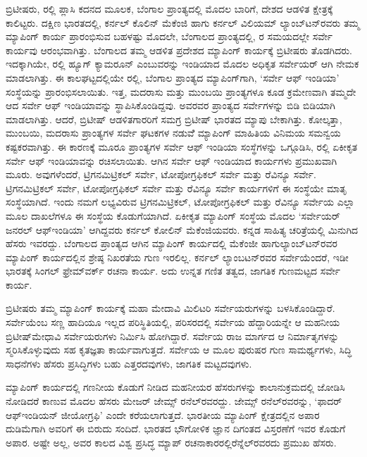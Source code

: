 ಬ್ರಿಟೀಷರು,  ರಲ್ಲಿ ಪ್ಲಾಸಿ ಕದನದ ಮೂಲಕ, ಬೆಂಗಾಲ ಪ್ರಾಂತ್ಯದಲ್ಲಿ ಮೊದಲ ಬಾರಿಗೆ, ದೇಶದ ಆಡಳಿತ ಕ್ಷೇತ್ರಕ್ಕೆ ಕಾಲಿಟ್ಟರು. ದಕ್ಷಿಣ ಭಾರತದಲ್ಲಿ, ಕರ್ನಲ್​ ಕೊಲಿನ್​ ಮೆಕೆಂಜಿ ಹಾಗು ಕರ್ನಲ್​ ವಿಲಿಯಮ್ ಲ್ಯಾಂಬ್​ಟನ್​ರವರು ತಮ್ಮ ಮ್ಯಾಪಿಂಗ್​ ಕಾರ್ಯ ಪ್ರಾರಂಭಿಸುವ ಬಹಳಷ್ಟು ಮೊದಲೇ, ಬೆಂಗಾಲದ ಪ್ರಾಂತ್ಯದಲ್ಲಿ, ರ ಸಮಯದಲ್ಲೇ ಸರ್ವೇ ಕಾರ್ಯವು ಆರಂಭವಾಗಿತ್ತು. ಬೆಂಗಾಲದ ತಮ್ಮ ಆಡಳಿತ ಪ್ರದೇಶದ ಮ್ಯಾಪಿಂಗ್​ ಕಾರ್ಯಕ್ಕೆ ಬ್ರಿಟೀಷರು ತೊಡಗಿದರು. ಇದಕ್ಕಾಗಿಯೇ, ರಲ್ಲಿ ಹ್ಯೂಗ್​ ಕ್ಯಾಮರೂನ್​ ಎಂಬುವರನ್ನು ಇಂಡಿಯಾದ ಮೊದಲ ಅಧಿಕೃತ ಸರ್ವೇಯರ್​ ಆಗಿ ನೇಮಕ ಮಾಡಲಾಗಿತ್ತು. ಈ ಕಾಲಘಟ್ಟದಲ್ಲಿಯೇ ರಲ್ಲಿ, ಬೆಂಗಾಲ ಪ್ರಾಂತ್ಯದ ಮ್ಯಾಪಿಂಗ್​ಗಾಗಿ, ‘ಸರ್ವೇ ಆಫ್​ ಇಂಡಿಯಾ’ ಸಂಸ್ಥೆಯನ್ನು ಪ್ರಾರಂಭಿಸಲಾಯಿತು. ಇತ್ತ, ಮದರಾಸು ಮತ್ತು ಮುಂಬಯಿ ಪ್ರಾಂತ್ಯಗಳೂ ಕೂಡ ಕ್ರಮೇಣವಾಗಿ ತಮ್ಮದೇ ಆದ ಸರ್ವೇ ಆಫ್​ ಇಂಡಿಯಾವನ್ನು ಸ್ಥಾಪಿಸಿಕೊಂಡಿದ್ದವು. ಅವರವರ ಪ್ರಾಂತ್ಯದ ಸರ್ವೇಗಳನ್ನು ಬಿಡಿ ಬಿಡಿಯಾಗಿ ಮಾಡಲಾಗಿತ್ತು. ಆದರೆ, ಬ್ರಿಟೀಷ್​ ಆಡಳಿತಗಾರರಿಗೆ ಸಮಗ್ರ ಬ್ರಿಟೀಷ್​ ಭಾರತದ ಮ್ಯಾಪು ಬೇಕಾಗಿತ್ತು. ಕೋಲ್ಕತ್ತಾ, ಮುಂಬಯಿ, ಮದರಾಸು ಪ್ರಾಂತ್ಯಗಳ ಸರ್ವೇ ಘಟಕಗಳ ನಡುವೆೆ ಮ್ಯಾಪಿಂಗ್​ ಮಾಹಿತಿಯ ವಿನಿಮಯ ಸಮನ್ವಯ ಕಷ್ಟಕರವಾಗಿತ್ತು. ಈ ಕಾರಣಕ್ಕೆ ಮೂರೂ ಪ್ರಾಂತ್ಯಗಳ ಸರ್ವೇ ಆಫ್​ ಇಂಡಿಯಾ ಸಂಸ್ಥೆಗಳನ್ನು ಒಗ್ಗೂಡಿಸಿ, ರಲ್ಲಿ ಏಕೀಕೃತ ಸರ್ವೇ ಆಫ್​ ಇಂಡಿಯಾವನ್ನು ರಚಿಸಲಾಯಿತು. ಆಗಿನ ಸರ್ವೇ ಆಫ್​ ಇಂಡಿಯಾದ ಕಾರ್ಯಗಳು ಪ್ರಮುಖವಾಗಿ ಮೂರು. ಅವುಗಳೆಂದರೆ, ಟ್ರಿಗನಮಿಟ್ರಿಕಲ್​ ಸರ್ವೇ, ಟೋಪೋಗ್ರಫಿಕಲ್​ ಸರ್ವೇ ಮತ್ತು ರೆವಿನ್ಯೂ ಸರ್ವೇ. ಟ್ರಿಗನಮಿಟ್ರಿಕಲ್​ ಸರ್ವೇ, ಟೋಪೋಗ್ರಫಿಕಲ್​ ಸರ್ವೇ ಮತ್ತು ರೆವಿನ್ಯೂ ಸರ್ವೇ ಕಾರ್ಯಗಳಿಗೆ ಈ ಸಂಸ್ಥೆಯೇ ಮಾತೃ ಸಂಸ್ಥೆಯಾಗಿದೆ. ಇಂದು ನಮಗೆ ಲಭ್ಯವಿರುವ ಟ್ರಿಗನಮಿಟ್ರಿಕಲ್​, ಟೋಪೋಗ್ರಫಿಕಲ್​ ಮತ್ತು ರೆವಿನ್ಯೂ ಸರ್ವೇಯ ಎಲ್ಲಾ ಮೂಲ ದಾಖಲೆಗಳೂ ಈ ಸಂಸ್ಥೆಯ ಕೊಡುಗೆಯಾಗಿದೆ. ಏಕೀಕೃತ ಮ್ಯಾಪಿಂಗ್​ ಸಂಸ್ಥೆಯ ಮೊದಲ ‘ಸರ್ವೇಯರ್​ ಜನರಲ್​ ಆಫ್​ ಇಂಡಿಯಾ’ ಆಗಿದ್ದವರು ಕರ್ನಲ್​ ಕೋಲಿನ್​ ಮೆಕೆಂಜಿಯವರು. ಕನ್ನಡ ಸಾಹಿತ್ಯ ಚರಿತ್ರೆಯಲ್ಲಿ ಮಿನುಗಿದ ಹೆಸರು ಇವರದ್ದು. ಬೆಂಗಾಲದ ಪ್ರಾಂತ್ಯದ ಆಗಿನ ಮ್ಯಾಪಿಂಗ್​ ಕಾರ್ಯದಲ್ಲಿ ಮೆಕೆಂಜೀ ಹಾಗು\break ಲ್ಯಾಂಬ್​ಟನ್​ರವರ ಮ್ಯಾಪಿಂಗ್​ ಕಾರ್ಯದಲ್ಲಿನ ಶ್ರೇಷ್ಠ ನಿಖರತೆಯ ಗುಣ ಇರಲಿಲ್ಲ. ಕರ್ನಲ್​ ಲ್ಯಾಂಬಟನ್​ರವರ ಸರ್ವೇಯೆಂದರೆ, ಇಡೀ ಭಾರತಕ್ಕೆ ಸಿಂಗಲ್​ ಫ್ರೇಮ್‌ವರ್ಕ್ ರಚನಾ ಕಾರ್ಯ. ಅದು ಉನ್ನತ ಗಣಿತ ತತ್ವದ, ಜಾಗತಿಕ ಗುಣಮಟ್ಟದ ಸರ್ವೇ ಕಾರ್ಯ.

ಬ್ರಿಟೀಷರು ತಮ್ಮ ಮ್ಯಾಪಿಂಗ್​ ಕಾರ್ಯಕ್ಕೆ ಮಹಾ ಮೇದಾವಿ ಮಿಲಿಟರಿ ಸರ್ವೇಯರುಗಳನ್ನು ಬಳಸಿಕೊಂಡಿದ್ದಾರೆ. ಸರ್ವೇಯೆಂಬ ಸಣ್ಣ ಹಾದಿಯೂ ಇಲ್ಲದ ಪರಿಸ್ಥಿತಿಯಲ್ಲಿ, ಪರಿಸರದಲ್ಲಿ ಸರ್ವೇಯ ಹೆದ್ದಾರಿಯನ್ನೇ ಆ ಮಹನೀಯ ಬ್ರಿಟೀಷ್​ ಮೇಧಾವಿ ಸರ್ವೇಯರುಗಳು ನಿರ್ಮಿಸಿ ಹೋಗಿದ್ದಾರೆ. ಸರ್ವೇಯ ರಾಜ ಮಾರ್ಗದ ಆ ನಿರ್ಮಾತೃಗಳನ್ನು ಸ್ಮರಿಸಿಕೊಳ್ಳುವುದು ಸಹ ಕೃತಜ್ಞತಾ ಕಾರ್ಯವಾಗುತ್ತದೆ. ಸರ್ವೇಯ ಆ ಮೂಲ ಪುರುಷರ ಗುಣ ಸಾಮರ್ಥ್ಯಗಳು, ಸಿದ್ಧಿ ಸಾಧನೆಗಳು ಹೆಸರು ಪ್ರಸಿದ್ಧಿಗಳು ಬಹು ಎತ್ತರದವುಗಳು, ಜಾಗತಿಕ ಮಟ್ಟದವುಗಳು.

ಮ್ಯಾಪಿಂಗ್​ ಕಾರ್ಯದಲ್ಲಿ ಗಣನೀಯ ಕೊಡುಗೆ ನೀಡಿದ ಮಹನೀಯರ ಹೆಸರುಗಳನ್ನು ಕಾಲಾನುಕ್ರಮದಲ್ಲಿ ಜೋಡಿಸಿ ನೋಡಿದರೆ ಕಾಣುವ ಮೊದಲ ಹೆಸರು ಮೇಜರ್​ ಜೇಮ್ಸ್ ರನೆಲ್​ರವರದ್ದು. ಜೇಮ್ಸ್ ರನೆಲ್​ರವರನ್ನು, ‘ಫಾದರ್​ ಆಫ್​ ಇಂಡಿಯನ್​ ಜೀಯೋಗ್ರಫಿ’ ಎಂದೇ ಕರೆಯಲಾಗುತ್ತದೆ. ಭಾರತೀಯ ಮ್ಯಾಪಿಂಗ್​ ಕ್ಷೇತ್ರದಲ್ಲಿನ ಅಪಾರ ದುಡಿಮೆಗಾಗಿ ಅವರಿಗೆ ಈ ಬಿರುದು ಸಂದಿದೆ. ಭಾರತದ ಭೌಗೋಳಿಕ ಜ್ಞಾನ ದಿಗಂತದ ವಿಸ್ತರಣೆಗೆ ಇವರ ಕೊಡುಗೆ ಅಪಾರ. ಅಷ್ಟೇ ಅಲ್ಲ, ಅವರ ಕಾಲದ ವಿಶ್ವ ಪ್ರಸಿದ್ಧ ಮ್ಯಾಪ್​ ರಚನಾಕಾರರಲ್ಲಿ\break ರೆನ್ನೆಲ್​ರವರದು ಪ್ರಮುಖ ಹೆಸರು.

